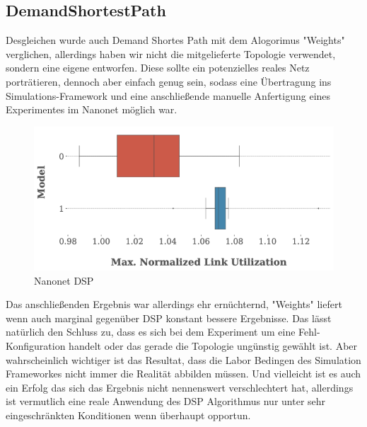 \documentclass[sigconf,noacm,review]{acmart}
\begin{document}
\subsection{DemandShortestPath}
Desgleichen wurde auch Demand Shortes Path mit dem Alogorimus "Weights" verglichen, allerdings haben wir nicht die mitgelieferte Topologie verwendet, sondern eine eigene entworfen. Diese sollte ein potenzielles reales Netz porträtieren, dennoch aber einfach genug sein, sodass eine Übertragung ins Simulations-Framework und eine anschließende manuelle Anfertigung eines Experimentes im Nanonet möglich war. 
\begin{figure}
  \centering
  \caption{Nanonet DSP}
  \label{fig:figNanonetDSP}
  \includegraphics[width=\linewidth]{assets/figNanonetDSP.png}
\end{figure}
Das anschließenden Ergebnis war allerdings ehr ernüchternd, "Weights" liefert wenn auch marginal gegenüber DSP konstant bessere Ergebnisse. Das lässt natürlich den Schluss zu, dass es sich bei dem Experiment um eine Fehl-Konfiguration handelt oder das gerade die Topologie ungünstig gewählt ist. Aber wahrscheinlich wichtiger ist das Resultat, dass die Labor Bedingen des Simulation Frameworkes nicht immer die Realität abbilden müssen. Und vielleicht ist es auch ein Erfolg das sich das Ergebnis nicht nennenswert verschlechtert hat, allerdings ist vermutlich eine reale Anwendung des DSP Algorithmus nur unter sehr eingeschränkten Konditionen wenn überhaupt opportun.
\end{document}
